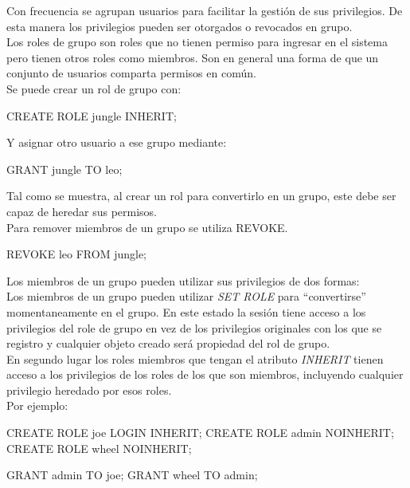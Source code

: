 Con frecuencia se agrupan usuarios para facilitar la gestión de sus privilegios. De esta manera los privilegios pueden ser otorgados o revocados en grupo.\\

Los roles de grupo son roles que no tienen permiso para ingresar en el sistema pero tienen otros roles como miembros. Son en general una forma de que un conjunto de usuarios comparta permisos en común.\\

Se puede crear un rol de grupo con:\\

\begin{pyglist}
CREATE ROLE jungle INHERIT;
\end{pyglist}

Y asignar otro usuario a ese grupo mediante:\\

\begin{pyglist}
GRANT jungle TO leo;
\end{pyglist}

Tal como se muestra, al crear un rol para convertirlo en un grupo, este debe ser capaz de heredar sus permisos.\\

Para remover miembros de un grupo se utiliza REVOKE.\\

\begin{pyglist}
REVOKE leo FROM jungle;
\end{pyglist}

Los miembros de un grupo pueden utilizar sus privilegios de dos formas:\\

Los miembros de un grupo pueden utilizar \textit{SET ROLE} para ``convertirse'' momentaneamente en el grupo. En este estado la sesión tiene acceso a los privilegios del role de grupo en vez de los privilegios originales con los que se registro y cualquier objeto creado será propiedad del rol de grupo. \\

En segundo lugar los roles miembros que tengan el atributo \textit{INHERIT} tienen acceso a los privilegios de los roles de los que son miembros, incluyendo cualquier privilegio heredado por esos roles.\\

Por ejemplo:\\

\begin{pyglist}
CREATE ROLE joe LOGIN INHERIT;
CREATE ROLE admin NOINHERIT;
CREATE ROLE wheel NOINHERIT;

GRANT admin TO joe;
GRANT wheel TO admin;
\end{pyglist}

